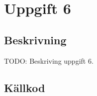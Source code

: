 \section{Uppgift 6}\label{uppgift-6}

\subsection{Beskrivning}
TODO: Beskriving uppgift 6.

\subsection{Källkod}\label{uppgift-6_src}
\inputminted[]{java}{../src/Lab1Uppg06.java}
